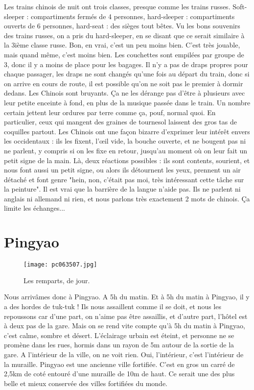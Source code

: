 \documentclass{book}
\begin{document}
Les trains chinois de nuit ont trois classes, presque comme les trains russes. Soft-sleeper : compartiments fermés de 4 personnes, hard-sleeper : compartiments ouverts de 6 personnes, hard-seat : des sièges tout bêtes. Vu les bons souvenirs des trains russes, on a pris du hard-sleeper, en se disant que ce serait similaire à la 3ième classe russe. Bon, en vrai, c'est un peu moins bien. C'est très jouable, mais quand même, c'est moins bien. Les couchettes sont empilées par groupe de 3, donc il y a moins de place pour les bagages. Il n'y a pas de draps propres pour chaque passager, les draps ne sont changés qu'une fois au départ du train, donc si on arrive en cours de route, il est possible qu'on ne soit pas le premier à dormir dedans. Les Chinois sont bruyants. Ça ne les dérange pas d'être à plusieurs avec leur petite enceinte à fond, en plus de la musique passée dans le train. Un nombre certain jettent leur ordures par terre comme ça, pouf, normal quoi. En particulier, ceux qui mangent des graines de tournesol laissent des gros tas de coquilles partout. Les Chinois ont une façon bizarre d'exprimer leur intérêt envers les occidentaux : ils les fixent, l’œil vide, la bouche ouverte, et ne bougent pas ni ne parlent, y compris si on les fixe en retour, jusqu'au moment où on leur fait un petit signe de la main. Là, deux réactions possibles : ils sont contents, sourient, et nous font aussi un petit signe, ou alors ils détournent les yeux, prennent un air détaché et font genre "hein, non, c'était pas moi, très intéressant cette tâche sur la peinture". Il est vrai que la barrière de la langue n'aide pas. Ils ne parlent ni anglais ni allemand ni rien, et nous parlons très exactement 2 mots de chinois. Ça limite les échanges...



\chapter{Pingyao}

\begin{wrapfigure}{l}{0.55\textwidth}
\centering
\texttt{[image: pc063507.jpg]}
\caption*{Les remparts, de jour.}
\end{wrapfigure}


Nous arrivâmes donc à Pingyao. A 5h du matin. Et à 5h du matin à Pingyao, il y a des hordes de tuk-tuk ! Ils nous assaillent comme il se doit, et nous les repoussons car d'une part, on n'aime pas être assaillis, et d'autre part, l'hôtel est à deux pas de la gare. Mais on se rend vite compte qu'à 5h du matin à Pingyao, c'est calme, sombre et désert. L'éclairage urbain est éteint, et personne ne se promène dans les rues, hormis dans un rayon de 5m autour de la sortie de la gare. A l'intérieur de la ville, on ne voit rien. Oui, l'intérieur, c'est l'intérieur de la muraille. Pingyao est une ancienne ville fortifiée. C'est en gros un carré de 2,5km de coté entouré d'une muraille de 10m de haut. Ce serait une des plus belle et mieux conservée des villes fortifiées du monde.
\end{document}
